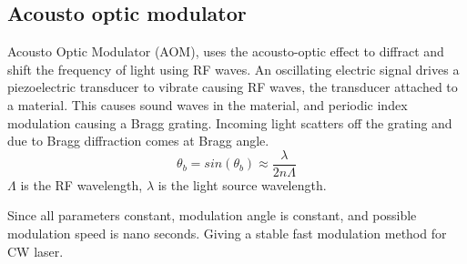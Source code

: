 \documentclass[\main/master.tex]{subfiles}
\begin{document}
\subsection{Acousto optic modulator}
Acousto Optic Modulator (AOM), uses the acousto-optic effect to diffract and shift the frequency of light using RF waves. An oscillating electric signal drives a piezoelectric transducer to vibrate causing RF waves, the transducer attached to a material. This causes sound waves in the material, and periodic index modulation causing a Bragg grating. Incoming light scatters off the grating and due to Bragg diffraction comes at Bragg angle.
\begin{equation}
\theta_b = sin(\theta_b)\approx \frac{\lambda}{2n\Lambda} \label{eqn:energy-mass-equivalence-relation}
\end{equation} 
$\Lambda$ is the RF wavelength, $\lambda$ is the light source wavelength. 
\par\noindent
Since all parameters constant, modulation angle is constant, and possible modulation speed is nano seconds. Giving a stable fast modulation method for CW laser.
\end{document}
